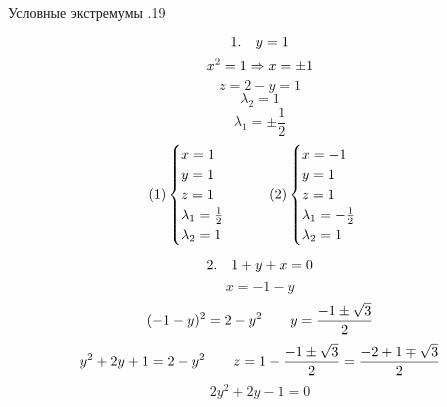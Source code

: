 \documentclass[12pt, fleqn]{article}
\begin{document}
\begin{lect} {Условные экстремумы .19}
\begin{Task}[3]
            \[1. \quad y = 1\]
            \[x^2 = 1 \Rightarrow x = \pm 1\]
            \[z = 2 - y = 1\]
            \[\lambda_2 = 1\]
            \[\lambda_1 = \pm \frac{1}{2}\]
            \[(1) \begin{cases}
                x = 1\\
                y = 1\\
                z = 1\\
                \lambda_1 = \frac{1}{2}\\
                \lambda_2 = 1
            \end{cases} \qquad (2) \begin{cases}
                x = -1\\
                y = 1\\
                z = 1\\
                \lambda_1 = -\frac{1}{2}\\
                \lambda_2 = 1
            \end{cases}\]

            \[2. \quad 1 + y + x = 0\]
            \[x = -1 - y\]
            \[(-1 - y)^2 = 2 - y^2 \qquad y = \frac{-1 \pm \sqrt{3}}{2}\]
            \[y^2 + 2y + 1 = 2 - y^2 \qquad z = 1 - \frac{-1 \pm \sqrt{3}}{2} = 
            \frac{-2 + 1 \mp \sqrt{3}}{2}\]
            \[2y^2 + 2y - 1 = 0\]      
        \end{Task}
    \end{lect} 
\end{document}
